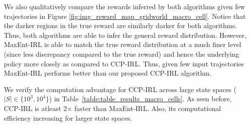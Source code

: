 \documentclass{article}
\begin{document}

We also qualitatively compare the rewards inferred by both algorithms given few trajectories in 
Figure \ref{fig:img_reward_map_gridworld_macro_cell}. Notice that the darker regions in the true reward are similarly darker for both algorithms. Thus, both algorithms are able to infer the general reward distribution. However, MaxEnt-IRL is able to match the true reward distribution at a much finer level (since less discrepancy compared to the true reward) and hence the underlying policy more closely as compared to CCP-IRL.
Thus, given few input trajectories MaxEnt-IRL performs better than our proposed CCP-IRL algorithm.


We verify the computation advantage for CCP-IRL across large state spaces ($|S| \in \{10^3, 10^4\}$) in Table~\ref{table:table_results_macro_cells}. As seen before, CCP-IRL is atleast 2$\times$ faster than MaxEnt-IRL. Also, its computational efficiency increasing for larger state spaces.

\end{document}
